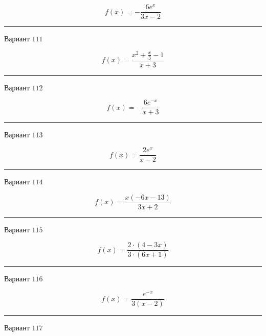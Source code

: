 \documentclass[11pt]{report}
\begin{document}
$$f(x) = - \frac{6 e^{x}}{3 x - 2}$$
\begin{center}
\noindent\rule{8cm}{0.4pt}
\end{center}
Вариант $111$


$$f(x) = \frac{x^{2} + \frac{x}{3} - 1}{x + 3}$$
\begin{center}
\noindent\rule{8cm}{0.4pt}
\end{center}
Вариант $112$


$$f(x) = - \frac{6 e^{- x}}{x + 3}$$
\begin{center}
\noindent\rule{8cm}{0.4pt}
\end{center}
Вариант $113$


$$f(x) = \frac{2 e^{x}}{x - 2}$$
\begin{center}
\noindent\rule{8cm}{0.4pt}
\end{center}
Вариант $114$


$$f(x) = \frac{x \left(- 6 x - 13\right)}{3 x + 2}$$
\begin{center}
\noindent\rule{8cm}{0.4pt}
\end{center}
Вариант $115$


$$f(x) = \frac{2 \cdot \left(4 - 3 x\right)}{3 \cdot \left(6 x + 1\right)}$$
\begin{center}
\noindent\rule{8cm}{0.4pt}
\end{center}
Вариант $116$


$$f(x) = \frac{e^{- x}}{3 \left(x - 2\right)}$$
\begin{center}
\noindent\rule{8cm}{0.4pt}
\end{center}
Вариант $117$
\end{document}
